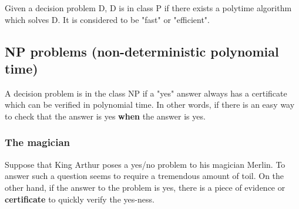 \documentclass[9pt, letterpaper, oneside]{article}
\begin{document}
Given a decision problem D, D is in class P if there exists a polytime algorithm which solves D. It is considered to be "fast" or "efficient".

\subsection{NP problems (non-deterministic polynomial time)}

A decision problem is in the class NP if a "yes" answer always has a certificate which can be verified in polynomial time. In other words, if there is an easy way to check that the answer is yes \textbf{when} the answer is yes.

\subsubsection{The magician}

Suppose that King Arthur poses a yes/no problem to his magician Merlin. To answer such a question seems to require a tremendous amount of toil. On the other hand, if the answer to the problem is yes, there is a piece of evidence or \textbf{certificate} to quickly verify the yes-ness.
\end{document}
